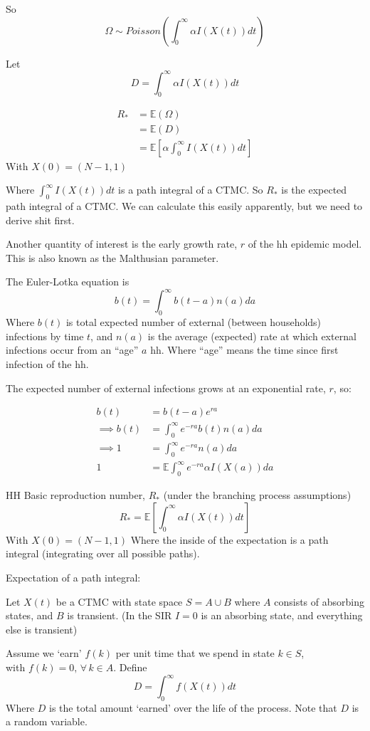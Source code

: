 \documentclass{/home/janmebows/Documents/LatexTemplates/myassignment}
\begin{document}
So
\[\Omega \sim Poisson\left(\int_0^\infty \alpha I(X(t))dt\right)\]

Let 
\[D = \int_0^\infty \alpha I(X(t))dt\]

\begin{align*}
    R_* &= \mathbb{E}(\Omega)\\
    &= \mathbb{E}(D)\\
    &= \mathbb{E}\left[\alpha \int_0^\infty I(X(t))dt\right]
\end{align*}
With $X(0) = (N-1,1)$

Where $\int_0^\infty I(X(t))dt$ is a path integral of a CTMC.
So $R_*$ is the expected path integral of a CTMC.
We can calculate this easily apparently, but we need to derive shit first.


Another quantity of interest is the early growth rate, $r$ of the hh epidemic model. This is also known as the Malthusian parameter.

The Euler-Lotka equation is
\[b(t) = \int_0^\infty b(t-a) n(a) da\]
Where $b(t)$ is total expected number of external (between households) infections by time $t$, and $n(a)$ is the average (expected) rate at which external infections occur from an ``age'' $a$ hh. Where ``age'' means the time since first infection of the hh. 

The expected number of external infections grows at an exponential rate, $r$, so:

\begin{align*}
    b(t) &= b(t-a) e^{ra}\\
    \implies b(t) &= \int_0^\infty e^{-ra} b(t) n(a) da\\
    \implies 1 &= \int_0^\infty e^{-ra} n(a) da\\
    1 &= \mathbb{E} \int_0^\infty e^{-ra} \alpha I(X(a)) da
\end{align*}




HH Basic reproduction number, $R_*$ (under the branching process assumptions)
\[R_* = \mathbb{E} \left[\int_0^\infty \alpha I(X(t)) dt\right]\]
With $X(0) = (N-1,1)$
Where the inside of the expectation is a path integral (integrating over all possible paths).


Expectation of a path integral:

Let $X(t)$ be a CTMC with state space $S = A \cup B$ where $A$ consists of absorbing states, and $B$ is transient. (In the SIR $I=0$ is an absorbing state, and everything else is transient)

Assume we `earn' $f(k)$ per unit time that we spend in state $k\in S$, \\
with $f(k) = 0,\,\forall\, k\in A$.
Define
\[D = \int_0^\infty f(X(t)) dt\]
Where $D$ is the total amount `earned' over the life of the process. Note that $D$ is a random variable.
\end{document}
